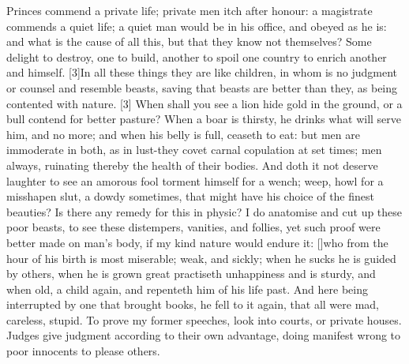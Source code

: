 {Princes commend a private life; private men itch after honour: a
magistrate commends a quiet life; a quiet man would be in his office,
and obeyed as he is: and what is the cause of all this, but that they
know not themselves? Some delight to destroy, one to build,
another to spoil one country to enrich another and himself. [3\baselineskip]In all
these things they are like children, in whom is no judgment or counsel
and resemble beasts, saving that beasts are better than they, as being
contented with nature. [3\baselineskip] When shall you see a lion hide gold in the
ground, or a bull contend for better pasture? When a boar is thirsty,
he drinks what will serve him, and no more; and when his belly is full,
ceaseth to eat: but men are immoderate in both, as in lust-they covet
carnal copulation at set times; men always, ruinating thereby the
health of their bodies. And doth it not deserve laughter to see an
amorous fool torment himself for a wench; weep, howl for a misshapen
slut, a dowdy sometimes, that might have his choice of the finest
beauties? Is there any remedy for this in physic? I do anatomise and
cut up these poor beasts, to see these distempers, vanities, and
follies, yet such proof were better made on man's body, if my kind
nature would endure it: [\baselineskip]who from the hour of his birth is most
miserable; weak, and sickly; when he sucks he is guided by others, when
he is grown great practiseth unhappiness and is sturdy, and when
old, a child again, and repenteth him of his life past. And here being
interrupted by one that brought books, he fell to it again, that all
were mad, careless, stupid. To prove my former speeches, look into
courts, or private houses. Judges give judgment according to their
own advantage, doing manifest wrong to poor innocents to please others.

}
